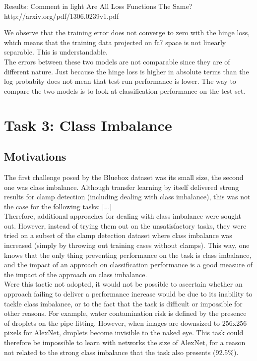\documentclass[a4paper,11pt]{article}
\begin{document}
Results:
Comment in light Are All Loss Functions The Same? http://arxiv.org/pdf/1306.0239v1.pdf

We observe that the training error does not converge to zero with the hinge loss, which means that the training data projected on fc7 space is not linearly separable. This is understandable. \\

The errors between these two models are not comparable since they are of different nature. Just because the hinge loss is higher in absolute terms than the log probabity does not mean that test run performance is lower. The way to compare the two models is to look at classification performance on the test set. \\

\clearpage
\section{Task 3: Class Imbalance}

\subsection{Motivations}

The first challenge posed by the Bluebox dataset was its small size, the second one was class imbalance. Although transfer learning by itself delivered strong results for clamp detection (including dealing with class imbalance), this was not the case for the following tasks: [...] \\

Therefore, additional approaches for dealing with class imbalance were sought out. However, instead of trying them out on the unsatisfactory tasks, they were tried on a subset of the clamp detection dataset where class imbalance was increased (simply by throwing out training cases without clamps). This way, one knows that the only thing preventing performance on the task is class imbalance, and the impact of an approach on classification performance is a good measure of the impact of the approach on class imbalance. \\

Were this tactic not adopted, it would not be possible to ascertain whether an approach failing to deliver a performance increase would be due to its inability to tackle class imbalance, or to the fact that the task is difficult or impossible for other reasons. For example, water contamination risk is defined by the presence of droplets on the pipe fitting. However, when images are downsized to 256x256 pixels for AlexNet, droplets become invisible to the naked eye. This task could therefore be impossible to learn with networks the size of AlexNet, for a reason not related to the strong class imbalance that the task also presents (92.5\%). \\
\end{document}

